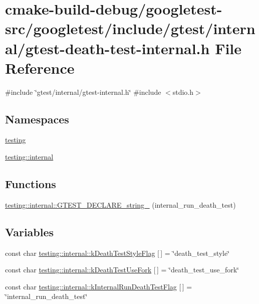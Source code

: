 \hypertarget{gtest-death-test-internal_8h}{}\section{cmake-\/build-\/debug/googletest-\/src/googletest/include/gtest/internal/gtest-\/death-\/test-\/internal.h File Reference}
\label{gtest-death-test-internal_8h}
{\ttfamily \#include \char`\"{}gtest/internal/gtest-\/internal.\+h\char`\"{}}\newline
{\ttfamily \#include $<$stdio.\+h$>$}\newline
\subsection*{Namespaces}
\begin{DoxyCompactItemize}
\item 
 \mbox{\hyperlink{namespacetesting}{testing}}
\item 
 \mbox{\hyperlink{namespacetesting_1_1internal}{testing\+::internal}}
\end{DoxyCompactItemize}
\subsection*{Functions}
\begin{DoxyCompactItemize}
\item 
\mbox{\hyperlink{namespacetesting_1_1internal_ac20f635c3285878fc1195ce687f23950}{testing\+::internal\+::\+G\+T\+E\+S\+T\+\_\+\+D\+E\+C\+L\+A\+R\+E\+\_\+string\+\_\+}} (internal\+\_\+run\+\_\+death\+\_\+test)
\end{DoxyCompactItemize}
\subsection*{Variables}
\begin{DoxyCompactItemize}
\item 
const char \mbox{\hyperlink{namespacetesting_1_1internal_a008ebfe0c0347d65e5e06e4d310981b3}{testing\+::internal\+::k\+Death\+Test\+Style\+Flag}} \mbox{[}$\,$\mbox{]} = \char`\"{}death\+\_\+test\+\_\+style\char`\"{}
\item 
const char \mbox{\hyperlink{namespacetesting_1_1internal_a32051e2574562b548be3e26a52eaa553}{testing\+::internal\+::k\+Death\+Test\+Use\+Fork}} \mbox{[}$\,$\mbox{]} = \char`\"{}death\+\_\+test\+\_\+use\+\_\+fork\char`\"{}
\item 
const char \mbox{\hyperlink{namespacetesting_1_1internal_a8572303d929880adf30db00952e1c45d}{testing\+::internal\+::k\+Internal\+Run\+Death\+Test\+Flag}} \mbox{[}$\,$\mbox{]} = \char`\"{}internal\+\_\+run\+\_\+death\+\_\+test\char`\"{}
\end{DoxyCompactItemize}
